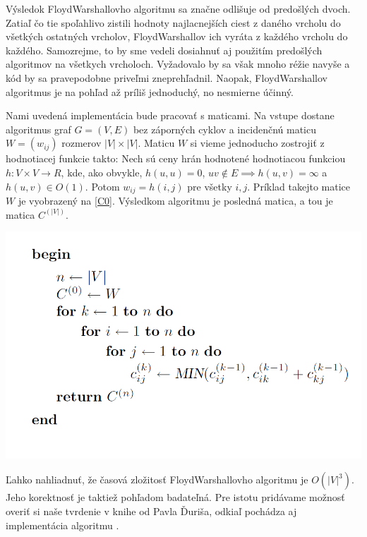 Výsledok Floyd\textendash Warshallovho algoritmu sa značne odlišuje od predošlých dvoch. Zatiaľ čo tie spoľahlivo zistili hodnoty najlacnejších ciest z daného vrcholu do všetkých ostatných vrcholov, Floyd\textendash Warshallov ich vyráta z každého vrcholu do každého. Samozrejme, to by sme vedeli dosiahnuť aj použitím predošlých algoritmov na všetkych vrcholoch. Vyžadovalo by sa však mnoho réžie navyše a kód by sa pravepodobne priveľmi zneprehľadnil. Naopak, Floyd\textendash Warshallov algoritmus je na pohľad až príliš jednoduchý, no nesmierne účinný.

Nami uvedená implementácia bude pracovať s maticami. Na vstupe dostane algoritmus graf $G = (V, E)$ bez záporných cyklov a incidenčnú maticu $W = (w_{ij})$ rozmerov $|V|\times |V|$. Maticu $W$ si vieme jednoducho zostrojiť z hodnotiacej funkcie takto: Nech sú ceny hrán hodnotené hodnotiacou funkciou $h: V \times V \rightarrow R$, kde, ako obvykle, $h(u,u) = 0$, $uv \notin E \implies h(u,v) = \infty$ a $h(u,v) \in O(1)$. Potom $w_{ij} = h(i,j)$ pre všetky $i, j$. Príklad takejto matice $W$ je vyobrazený na \ref{C0}. Výsledkom algoritmu je posledná matica, a tou je matica $C^{(|V|)}$.\newline

\begin{algorithm}[H]
  \includegraphics[width=\linewidth]{./images/Alg_Floyd-Warshall.png}
  \caption{Floyd\textendash Washallov algoritmus}
  \label{Alg_Floyd-Warshall}
  \centering
\end{algorithm}

Ľahko nahliadnuť, že časová zložitosť Floyd\textendash Warshallovho algoritmu je $O(|V|^{3})$. Jeho korektnosť je taktiež pohľadom badateľná. Pre istotu pridávame možnosť overiť si naše tvrdenie v knihe od Pavla Ďuriša, odkiaľ pochádza aj implementácia algoritmu \cite[kapitola 2.2.2]{duris2009}.\newline

